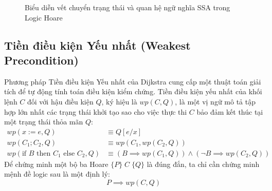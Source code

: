 \begin{figure}[H]
\centering
{}
\caption{Biểu diễn vết chuyển trạng thái và quan hệ ngữ nghĩa SSA trong Logic Hoare}
\label{fig:hoare_ssa_flow}
\end{figure}


\subsection{Tiền điều kiện Yếu nhất (Weakest Precondition)}
Phương pháp Tiền điều kiện Yếu nhất của Dijkstra cung cấp một thuật toán giải tích để tự động tính toán điều kiện kiểm chứng. Tiền điều kiện yếu nhất của khối lệnh $C$ đối với hậu điều kiện $Q$, ký hiệu là $wp(C, Q)$, là một vị ngữ mô tả tập hợp lớn nhất các trạng thái khởi tạo sao cho việc thực thi $C$ bảo đảm kết thúc tại một trạng thái thỏa mãn $Q$:
\begin{align}
wp(x := e, Q) &\equiv Q[e / x] \\
wp(C_1 ; C_2, Q) &\equiv wp(C_1, wp(C_2, Q)) \\
wp(\text{if } B \text{ then } C_1 \text{ else } C_2, Q) &\equiv (B \implies wp(C_1, Q)) \land (\neg B \implies wp(C_2, Q))
\end{align}
Để chứng minh một bộ ba Hoare $\{P\} \; C \; \{Q\}$ là đúng đắn, ta chỉ cần chứng minh mệnh đề logic sau là một định lý:
\begin{equation}
P \implies wp(C, Q)
\end{equation}

